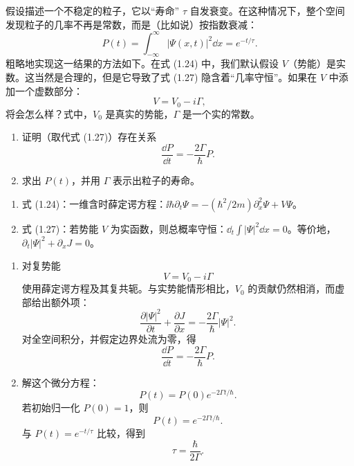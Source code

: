 \begin{question}
假设描述一个不稳定的粒子，它以“寿命” $\tau$ 自发衰变。在这种情况下，整个空间发现粒子的几率不再是常数，而是（比如说）按指数衰减：
\[
P(t)=\int_{-\infty}^{\infty}|\Psi(x,t)|^2\dd x=e^{-t/\tau}.
\]
粗略地实现这一结果的方法如下。在式 (1.24) 中，我们默认假设 $V$（势能）是实数。这当然是合理的，但是它导致了式 (1.27) 隐含着“几率守恒”。如果在 $V$ 中添加一个虚数部分：
\[
V=V_0-i\Gamma,
\]
将会怎么样？式中，$V_0$ 是真实的势能，$\Gamma$ 是一个实的常数。
\begin{enumerate}
\item 证明（取代式 (1.27)）存在关系
\[
\frac{\dd P}{\dd t}=-\frac{2\Gamma}{\hbar}P.
\]
\item 求出 $P(t)$，并用 $\Gamma$ 表示出粒子的寿命。
\end{enumerate}

\par\smallskip
{}
\begin{enumerate}[leftmargin=2.2em,itemsep=0.12em,topsep=0.12em,parsep=0pt]
\item 式 (1.24)：一维含时薛定谔方程：$\ii\hbar\partial_t\Psi=-(\hbar^2/2m)\partial_x^2\Psi+V\Psi$。
\item 式 (1.27)：若势能 $V$ 为实函数，则总概率守恒：$\dd_t\int |\Psi|^2\dd x=0$。等价地，$\partial_t|\Psi|^2+\partial_xJ=0$。
\end{enumerate}

\end{question}
\begin{solution}
\begin{enumerate}
\item 对复势能
\[
V=V_0-i\Gamma
\]
使用薛定谔方程及其复共轭。与实势能情形相比，$V_0$ 的贡献仍然相消，而虚部给出额外项：
\[
\frac{\partial |\Psi|^2}{\partial t}+\frac{\partial J}{\partial x}
=-\frac{2\Gamma}{\hbar}|\Psi|^2.
\]
对全空间积分，并假定边界处流为零，得
\[
\frac{\dd P}{\dd t}=-\frac{2\Gamma}{\hbar}P.
\]
\item 解这个微分方程：
\[
P(t)=P(0)e^{-2\Gamma t/\hbar}.
\]
若初始归一化 $P(0)=1$，则
\[
P(t)=e^{-2\Gamma t/\hbar}.
\]
与 $P(t)=e^{-t/\tau}$ 比较，得到
\[
\tau=\frac{\hbar}{2\Gamma}.
\]
\end{enumerate}
\end{solution}

